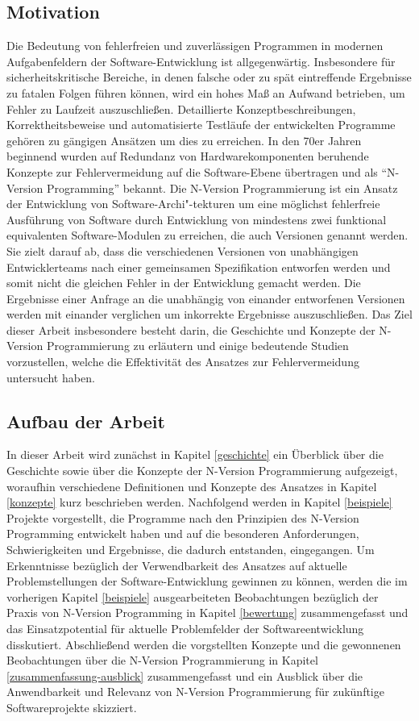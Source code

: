 \subsection{Motivation}\label{motivation}

Die Bedeutung von fehlerfreien und zuverlässigen Programmen in modernen Aufgabenfeldern der Software-Entwicklung ist allgegenwärtig.
Insbesondere für sicherheitskritische Bereiche, in denen falsche oder zu spät eintreffende Ergebnisse zu fatalen Folgen führen können, wird ein hohes Maß an Aufwand betrieben, um Fehler zu Laufzeit auszuschließen.
Detaillierte Konzeptbeschreibungen, Korrektheitsbeweise und automatisierte Testläufe der entwickelten Programme gehören zu gängigen Ansätzen um dies zu erreichen.
In den 70er Jahren beginnend wurden auf Redundanz von Hardwarekomponenten beruhende Konzepte zur Fehlervermeidung auf die Software-Ebene übertragen und als \enquote{N-Version Programming} \cite{Chen1978} bekannt.
Die N-Version Programmierung ist ein Ansatz der Entwicklung von Software-Archi"-tekturen um eine möglichst fehlerfreie Ausführung von Software durch Entwicklung von mindestens zwei funktional equivalenten Software-Modulen zu erreichen, die auch Versionen genannt werden.
Sie zielt darauf ab, dass die verschiedenen Versionen von unabhängigen Entwicklerteams nach einer gemeinsamen Spezifikation entworfen werden und somit nicht die gleichen Fehler in der Entwicklung gemacht werden.
Die Ergebnisse einer Anfrage an die unabhängig von einander entworfenen Versionen werden mit einander verglichen um inkorrekte Ergebnisse auszuschließen.
Das Ziel dieser Arbeit insbesondere besteht darin, die Geschichte und Konzepte der N-Version Programmierung zu erläutern und einige bedeutende Studien vorzustellen, welche die Effektivität des Ansatzes zur Fehlervermeidung untersucht haben.


\subsection{Aufbau der Arbeit}\label{aufbau}

In dieser Arbeit wird zunächst in Kapitel \ref{geschichte} ein Überblick über die Geschichte sowie über die Konzepte der N-Version Programmierung aufgezeigt, woraufhin verschiedene Definitionen und Konzepte des Ansatzes in Kapitel \ref{konzepte} kurz beschrieben werden. Nachfolgend werden in Kapitel \ref{beispiele} Projekte vorgestellt, die Programme nach den Prinzipien des N-Version Programming entwickelt haben und auf die besonderen Anforderungen, Schwierigkeiten und Ergebnisse, die dadurch entstanden, eingegangen.
Um Erkenntnisse bezüglich der Verwendbarkeit des Ansatzes auf aktuelle Problemstellungen der Software-Entwicklung gewinnen zu können, werden die im vorherigen Kapitel \ref{beispiele} ausgearbeiteten Beobachtungen bezüglich der Praxis von N-Version Programming in Kapitel \ref{bewertung} zusammengefasst und das Einsatzpotential für aktuelle Problemfelder der Softwareentwicklung disskutiert.
Abschließend werden die vorgstellten Konzepte und die gewonnenen Beobachtungen über die N-Version Programmierung in Kapitel \ref{zusammenfassung-ausblick} zusammengefasst und ein Ausblick über die Anwendbarkeit und Relevanz von N-Version Programmierung für zukünftige Softwareprojekte skizziert.